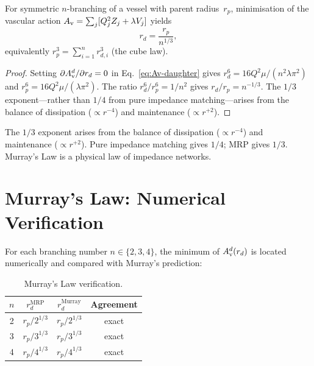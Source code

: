 \documentclass[aps,pre,twocolumn,superscriptaddress,floatfix]{revtex4-2}
\begin{document}
\begin{theorem}
\label{thm:murray}
For symmetric $n$-branching of a vessel with parent
radius~$r_p$, minimisation of the vascular action
$A_{\text{v}} = \sum_j [Q_j^2 Z_j + \lambda V_j]$ yields
\begin{equation}
  \boxed{r_d = \frac{r_p}{n^{1/3}},}
  \label{eq:murray}
\end{equation}
equivalently $r_p^3 = \sum_{i=1}^n r_{d,i}^3$
(the cube law).
\end{theorem}

\begin{proof}
Setting $\partial A_{\text{v}}^d/\partial r_d = 0$ in
Eq.~\eqref{eq:Av-daughter} gives
$r_d^6 = 16 Q^2 \mu / (n^2 \lambda \pi^2)$ and
$r_p^6 = 16 Q^2 \mu / (\lambda \pi^2)$.
The ratio $r_d^6/r_p^6 = 1/n^2$ gives
$r_d/r_p = n^{-1/3}$.
The $1/3$ exponent---rather than $1/4$ from pure
impedance matching---arises from the balance of
dissipation ($\propto r^{-4}$) and maintenance
($\propto r^{+2}$).
\end{proof}

\begin{remark}
The $1/3$ exponent arises from the balance of dissipation
($\propto r^{-4}$) and maintenance ($\propto r^{+2}$).
Pure impedance matching gives $1/4$; MRP gives $1/3$.
Murray's Law is a physical law of impedance networks.
\end{remark}


\section{Murray's Law: Numerical Verification}
\label{sec:murray-numerics}

For each branching number $n \in \{2, 3, 4\}$,
the minimum of $A_{\text{v}}^d(r_d)$ is located numerically and
compared with Murray's prediction:

\begin{table}[H]
\caption{Murray's Law verification.}
\label{tab:murray}
\begin{ruledtabular}
\begin{tabular}{cccc}
$n$ & $r_d^{\text{MRP}}$ & $r_d^{\text{Murray}}$ &
  Agreement \\
\hline
2 & $r_p / 2^{1/3}$ & $r_p / 2^{1/3}$ & exact \\
3 & $r_p / 3^{1/3}$ & $r_p / 3^{1/3}$ & exact \\
4 & $r_p / 4^{1/3}$ & $r_p / 4^{1/3}$ & exact \\
\end{tabular}
\end{ruledtabular}
\end{table}
\end{document}

